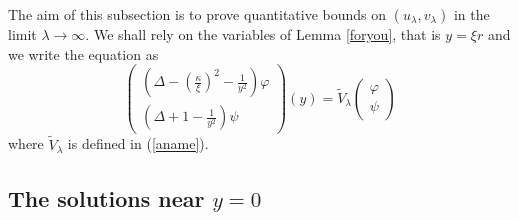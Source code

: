 \documentclass[11 pt]{amsart}
\theoremstyle{definition}
\theoremstyle{remark}
\numberwithin{equation}{section}
\begin{document}
The aim of this subsection is to prove quantitative bounds on $(u_\lambda,v_\lambda)$ in the limit $\lambda \to \infty$. We shall rely on the variables of Lemma \ref{foryou}, that is $y =
\xi r$ and we write the equation as
\begin{equation}
  \left(\begin{array}{c}
    \left( \Delta - \left( \frac{\kappa}{\xi} \right)^2 -
    \frac{1}{y^2} \right) \varphi\\
    \left( \Delta + 1 - \frac{1}{y^2} \right) \psi
  \end{array}\right) (y) = \widetilde{V}_{\lambda} \left(\begin{array}{c}
    \varphi\\
    \psi
  \end{array}\right) \label{lydmor2}
\end{equation}
where $\widetilde{V}_{\lambda}$ is defined in (\ref{aname}).

\subsection{The solutions near $y = 0$}
\end{document}
